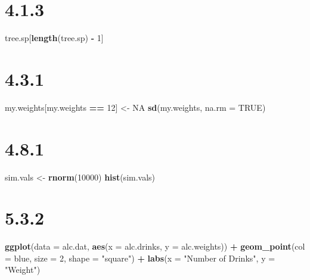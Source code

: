 \documentclass[
]{krantz}
\newenvironment{Shaded}{\begin{snugshade}}{\end{snugshade}}
\newcommand{\DataTypeTok}[1]{\textcolor[rgb]{0.13,0.29,0.53}{#1}}
\newcommand{\DecValTok}[1]{\textcolor[rgb]{0.00,0.00,0.81}{#1}}
\newcommand{\KeywordTok}[1]{\textcolor[rgb]{0.13,0.29,0.53}{\textbf{#1}}}
\newcommand{\NormalTok}[1]{#1}
\newcommand{\OperatorTok}[1]{\textcolor[rgb]{0.81,0.36,0.00}{\textbf{#1}}}
\newcommand{\OtherTok}[1]{\textcolor[rgb]{0.56,0.35,0.01}{#1}}
\newcommand{\StringTok}[1]{\textcolor[rgb]{0.31,0.60,0.02}{#1}}
\begin{document}
\hypertarget{section-1}{%
\section*{4.1.3}\label{section-1}}


\begin{Shaded}
\begin{Highlighting}[]
\NormalTok{tree.sp[}\KeywordTok{length}\NormalTok{(tree.sp) }\OperatorTok{{-}}\StringTok{ }\DecValTok{1}\NormalTok{]}
\end{Highlighting}
\end{Shaded}

\hypertarget{section-2}{%
\section*{4.3.1}\label{section-2}}


\begin{Shaded}
\begin{Highlighting}[]
\NormalTok{my.weights[my.weights }\OperatorTok{==}\StringTok{ }\DecValTok{12}\NormalTok{] \textless{}{-}}\StringTok{ }\OtherTok{NA}
\KeywordTok{sd}\NormalTok{(my.weights, }\DataTypeTok{na.rm =} \OtherTok{TRUE}\NormalTok{)}
\end{Highlighting}
\end{Shaded}

\hypertarget{section-3}{%
\section*{4.8.1}\label{section-3}}


\begin{Shaded}
\begin{Highlighting}[]
\NormalTok{sim.vals \textless{}{-}}\StringTok{ }\KeywordTok{rnorm}\NormalTok{(}\DecValTok{10000}\NormalTok{)}
\KeywordTok{hist}\NormalTok{(sim.vals)}
\end{Highlighting}
\end{Shaded}

\hypertarget{section-4}{%
\section*{5.3.2}\label{section-4}}


\begin{Shaded}
\begin{Highlighting}[]
\KeywordTok{ggplot}\NormalTok{(}\DataTypeTok{data =}\NormalTok{ alc.dat, }\KeywordTok{aes}\NormalTok{(}\DataTypeTok{x =}\NormalTok{ alc.drinks, }\DataTypeTok{y =}\NormalTok{ alc.weights)) }\OperatorTok{+}\StringTok{ }
\StringTok{  }\KeywordTok{geom\_point}\NormalTok{(}\DataTypeTok{col =} \StringTok{\textquotesingle{}blue\textquotesingle{}}\NormalTok{, }\DataTypeTok{size =} \DecValTok{2}\NormalTok{, }\DataTypeTok{shape =} \StringTok{"square"}\NormalTok{) }\OperatorTok{+}\StringTok{ }
\StringTok{  }\KeywordTok{labs}\NormalTok{(}\DataTypeTok{x =} \StringTok{"Number of Drinks"}\NormalTok{, }
       \DataTypeTok{y =} \StringTok{"Weight"}\NormalTok{)}
\end{Highlighting}
\end{Shaded}
\end{document}
